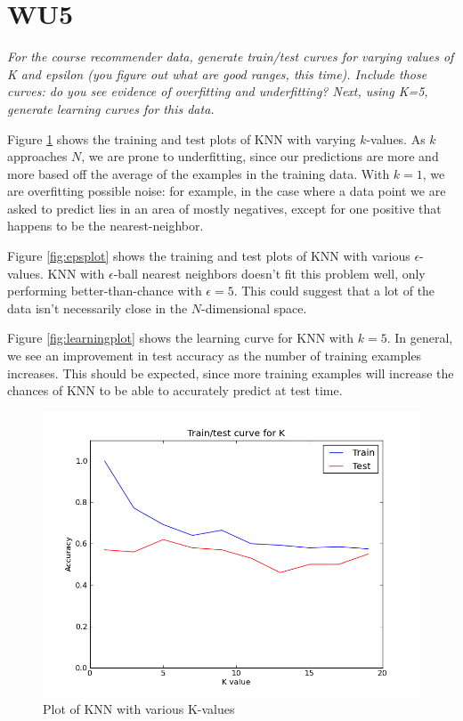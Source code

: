 \section*{WU5}

\textit{For the course recommender data, generate train/test curves for varying values of K and epsilon (you figure out what are good ranges, this time). Include those curves: do you see evidence of overfitting and underfitting? Next, using K=5, generate learning curves for this data.}

Figure \ref{fig:kplot} shows the training and test plots of KNN with varying $k$-values. As $k$ approaches $N$, we are prone to underfitting, since our predictions are more and more based off the average of the examples in the training data. With $k=1$, we are overfitting possible noise: for example, in the case where a data point we are asked to predict lies in an area of mostly negatives, except for one positive that happens to be the nearest-neighbor.

Figure \ref{fig:epsplot} shows the training and test plots of KNN with various $\epsilon$-values. KNN with $\epsilon$-ball nearest neighbors doesn't fit this problem well, only performing better-than-chance with $\epsilon=5$. This could suggest that a lot of the data isn't necessarily close in the $N$-dimensional space.

Figure \ref{fig:learningplot} shows the learning curve for KNN with $k=5$. In general, we see an improvement in test accuracy as the number of training examples increases. This should be expected, since more training examples will increase the chances of KNN to be able to accurately predict at test time.


\begin{figure}
	\caption{Plot of KNN with various K-values}
	\label{fig:kplot}
	\includegraphics[width=6.5in]{images/knn_k_plot.png}
\end{figure}

